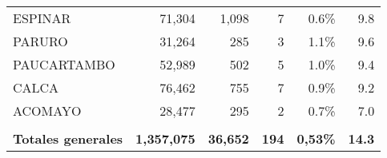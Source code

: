 \begin{tabular}{lrrrrr}
	\cellcolor[HTML]{FFFFC7}ESPINAR       & 71,304             & 1,098                               & 7                  & 0.6\%                      & 9.8                                                                                    \\
	\cellcolor[HTML]{FFFFC7}PARURO        & 31,264             & 285                                 & 3                  & 1.1\%                      & 9.6                                                                                    \\
	\cellcolor[HTML]{FFFFC7}PAUCARTAMBO   & 52,989             & 502                                 & 5                  & 1.0\%                      & 9.4                                                                                    \\
	\cellcolor[HTML]{FFFFC7}CALCA         & 76,462             & 755                                 & 7                  & 0.9\%                      & 9.2                                                                                    \\
	\cellcolor[HTML]{FFFFC7}ACOMAYO       & 28,477             & 295                                 & 2                  & 0.7\%                      & 7.0                                                                                    \\
	&                    &                                     &                    &                            &                                                                                        \\
	\rowcolor[HTML]{ECF4FF} 
	\textbf{Totales generales}            & \textbf{1,357,075} & \textbf{36,652}                     & \textbf{194}       & \textbf{0,53\%}            & \textbf{14.3}                                                                         
\end{tabular}